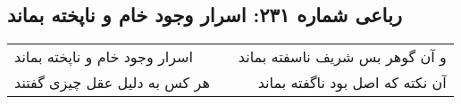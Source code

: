 \begin{center}
\section*{رباعی شماره ۲۳۱: اسرار وجود خام و ناپخته بماند}
\label{sec:sh231}
\begin{longtable}{l p{0.5cm} r}
اسرار وجود خام و ناپخته بماند
&&
و آن گوهر بس شریف ناسفته بماند
\\
هر کس به دلیل عقل چیزی گفتند
&&
آن نکته که اصل بود ناگفته بماند
\\
\end{longtable}
\end{center}
